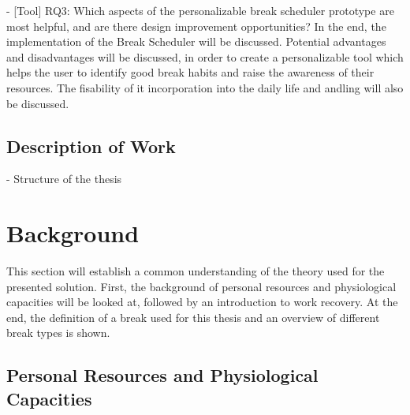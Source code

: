 \documentclass{hasel_thesis}
\begin{document}
-	[Tool] RQ3: Which aspects of the personalizable break scheduler prototype are most helpful, and are there design improvement opportunities?
In the end, the implementation of the Break Scheduler will be discussed. Potential advantages and disadvantages will be discussed, in order to create a personalizable tool which helps the user to identify good break habits and raise the awareness of their resources. The fisability of it incorporation into the daily life and andling will also be discussed.


\section{Description of Work}
- Structure of the thesis


%

 \chapter{Background}
 \begin{comment} 
 - Definition of a Break
 - Personal Resources and Physiological Capacities
 - Self-Reporting /self-Experimenting

 
\end{comment}

 This section will establish a common understanding of the theory used for the presented solution. First, the background of personal resources and physiological capacities will be looked at, followed by an introduction to work recovery. At the end, the definition of a break used for this thesis and an overview of different break types is shown.

\section{Personal Resources and Physiological Capacities}

\begin{comment} 
 - what are personal reouces, what are physiological capacities (done)
 - why is it important (done)

 
\end{comment}
\end{document}
